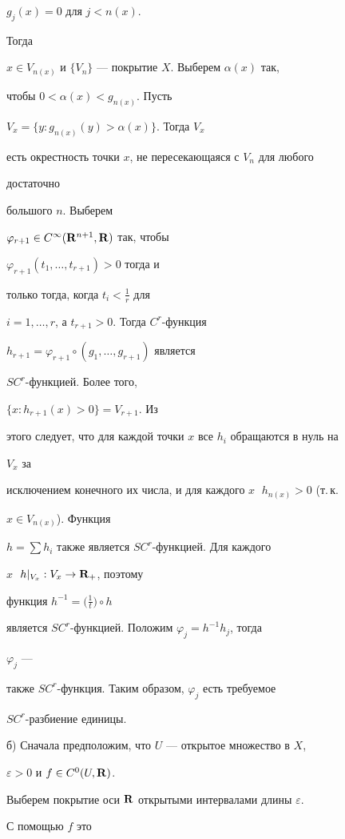 \begin{pf}
$g_j(x)=0$ для $j<n(x)$.


Тогда


$x\in V_{n(x)}$ и $\{V_n\}$ --- покрытие $X$. Выберем $\alpha(x)$ так,


чтобы $0<\alpha(x)<g_{n(x)}$. Пусть


$V_x=\{y:g_{n(x)}(y)>\alpha(x)\}$. Тогда $V_x$


есть окрестность точки $x$, не пересекающаяся с $V_n$ для любого


достаточно


большого $n$. Выберем


$\varphi_{r+1}\in C^\infty(\bold R^{n+1},\bold R)$ так, чтобы


$\varphi_{r+1}(t_1,\dotsc,t_{r+1})>0$ тогда и


только тогда, когда $t_i<\frac{1}{r}$ для


$i=1,\dotsc,r$, а $t_{r+1}>0$. Тогда $C^r$-функция


$h_{r+1}=\varphi_{r+1}\circ(g_1,\dotsc,g_{r+1})$ является


$SC^r$-функцией. Более того,


$\{x:h_{r+1}(x)>0\}=V_{r+1}$. Из


этого следует, что для каждой точки $x$ все $h_i$ обращаются в нуль на


$V_x$ за


исключением конечного их числа, и для каждого $x\;$ $h_{n(x)}>0$ (т.\,к.


$x\in V_{n(x)}$). Функция


$h=\sum h_i$ также является $SC^r$-функцией. Для каждого


$x\;$ $h|_{V_x}:V_x\to\bold R_+$, поэтому


функция $h^{-1}=\bigl(\frac{1}{t}\bigr)\circ h$


является $SC^r$-функцией. Положим $\varphi_j=h^{-1}h_j$, тогда


$\varphi_j$ ---


также $SC^r$-функция. Таким образом, $\varphi_j$ есть требуемое


$SC^r$-разбиение единицы.





б) Сначала предположим, что $U$ --- открытое множество в $X$,


$\varepsilon>0$ и $f\in C^0(U,\bold R)$.


Выберем покрытие оси $\bold R$ открытыми интервалами длины $\varepsilon$.


С помощью $f$ это



\end{pf}
